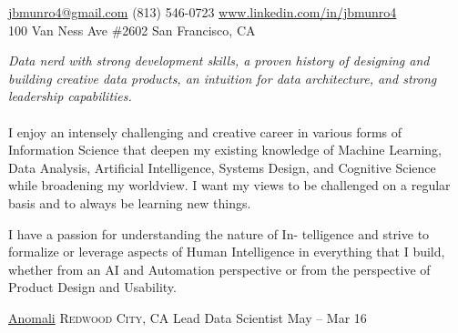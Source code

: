 \documentclass[10pt,a4paper]{article}
\begin{document}
\sloppy  %



\nobreakvspace{0.3em}  %

\noindent\href{mailto:jbmunro4.at.gmail.dot.com}{jbmunro4\mbox{}@\mbox{}gmail.com}\sbull
\textsmaller(813) 546-0723\sbull
\href{http://www.linkedin.com/in/jbmunro4}{www.linkedin.com/in/jbmunro4}
\\
100 Van Ness Ave \#2602\sbull
San Francisco, CA

\spacedhrule{0.9em}{-0.4em}  %


\vspace{-1.3em}  %
\begin{multicols}{2}  %
\noindent \emph{Data nerd with strong development skills, a proven history of designing and building creative data products, an intuition for data architecture, and strong leadership capabilities.}
\\
\\
I enjoy an intensely challenging and creative career in various forms of Information Science that deepen my existing knowledge of Machine Learning, Data Analysis, Artificial Intelligence, Systems Design, and Cognitive Science while broadening my worldview. I want my views to be challenged on a regular basis and to always be learning new things.

I have a passion for understanding the nature of In- telligence and strive to formalize or leverage aspects of Human Intelligence in everything that I build, whether from an AI and Automation perspective or from the perspective of Product Design and Usability.
\end{multicols}


\spacedhrule{0em}{-0.4em}


\headedsection  %
  {\href{http://www.anomali.com}{Anomali}}
  {\textsc{Redwood City, CA}} {%
  \headedsubsection
    {Lead Data Scientist}
    {May  -- Mar 16}
    {}
}
\end{document}
